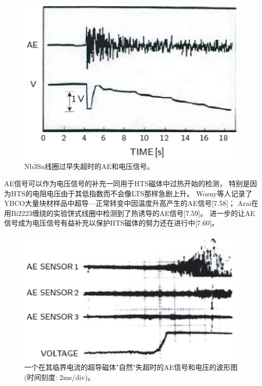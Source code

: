 \begin{figure}[htbp]
	\centering
	\includegraphics[scale=0.6]{chpt7/figs/fig7.8.eps}
	\caption{Nb3Sn线圈过早失超时的AE和电压信号。}
\end{figure}

AE信号可以作为电压信号的补充一同用于HTS磁体中过热开始的检测，
特别是因为HTS的电阻电压由于其低指数而不会像LTS那样急剧上升。
Wozny等人记录了YBCO大量块材样品中超导---正常转变中因温度升高产生的AE信号[7.58]；
Arai在用Bi2223缠绕的实验饼式线圈中检测到了热诱导的AE信号[7.59]。
进一步的让AE信号成为电压信号有益补充以保护HTS磁体的努力还在进行中[7.60]。

\begin{figure}[htbp]
	\centering
	\includegraphics[scale=0.6]{chpt7/figs/fig7.9.eps}
	\caption{一个在其临界电流的超导磁体"自然"失超时的AE信号和电压的波形图(时间刻度: 2ms/div)。}
\end{figure}

